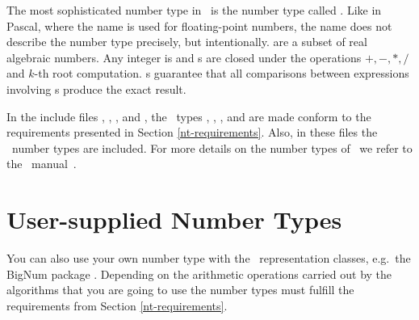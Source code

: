 The most sophisticated number type in \leda\ is the number type called
. Like in Pascal, where the name  is used for
floating-point numbers, the name  does not describe the
number type precisely, but intentionally.  
 are a subset of real algebraic
numbers.  Any integer is  and s are closed under
the operations $+,-,*,/$ and $k$-th root computation. 
s guarantee that
all comparisons between expressions involving s produce the
exact result.

In the include files , , 
, and , 
the \leda\ types , ,
, 
and  are made conform to the requirements presented in
Section \ref{nt-requirements}. 
Also, in these files the \leda\ number types are included.
For more details on the number types of \leda\ we refer to the \leda\ 
manual~\cite{mnsu-lum}.




\section{User-supplied Number Types}

You can also use your own number type with the \cgal\ representation
classes, e.g.\  the {\sc BigNum} package \cite{svh-bpepa-89}.
Depending on the arithmetic operations carried out by the algorithms
that you are going to use the number types must fulfill the
requirements from Section \ref{nt-requirements}. 

